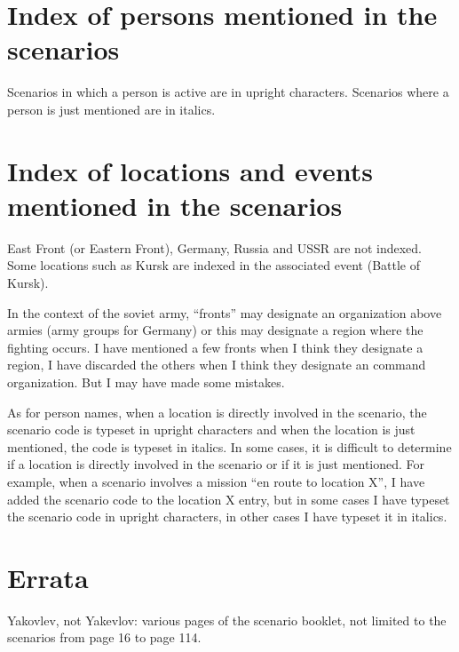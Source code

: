 \documentclass[a4paper,twocolumn]{article}
\begin{document}
\rmfamily
\section*{Index of persons mentioned in the scenarios}

Scenarios in which a person is active are in upright characters.
Scenarios where a person is just mentioned are in italics.

\vspace{3mm}


\section*{Index of locations and events mentioned in the scenarios}

East Front (or Eastern Front), Germany, Russia and USSR are not
indexed. Some locations such as Kursk are indexed in the associated
event (Battle of Kursk).

\vspace{3mm}

In the context of the soviet army, ``fronts'' may designate an
organization above armies (army groups for Germany) or this may
designate a region where the fighting occurs. I have mentioned a few
fronts when I think they designate a region, I have discarded the
others when I think they designate an command organization.
But I may have made some mistakes.

\vspace{3mm}

As for person names, when a location is directly involved in the
scenario, the scenario code is typeset in upright characters and when
the location is just mentioned, the code is typeset in italics.
In some cases, it is difficult to determine if a location is directly
involved in the scenario or if it is just mentioned. For example, when
a scenario involves a mission ``en route to location X'', I have
added the scenario code to the location X entry, but in some cases I have
typeset the scenario code in upright characters, in other cases I have
typeset it in italics.

\vspace{3mm}


\section*{Errata}

Yakovlev, not Yakevlov: various pages of the scenario booklet, not limited
to the scenarios from page 16 to page 114.

\end{document}
